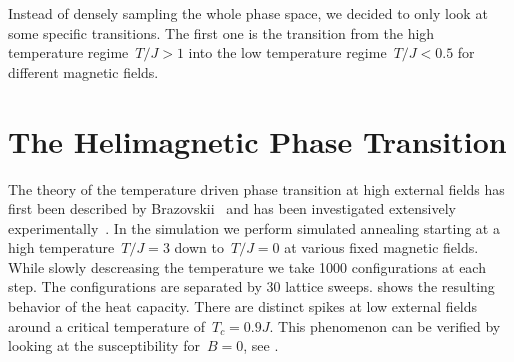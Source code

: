 Instead of densely sampling the whole phase space, we decided to only look at
some specific transitions. The first one is the transition from the high
temperature regime~$T/J > 1$ into the low temperature regime~$T/J < 0.5$ for
different magnetic fields.

\section{The Helimagnetic Phase Transition}\label{sec:details}
%
The theory of the temperature driven phase transition at high external fields
has first been described by Brazovskii~\cite{brazovskii} and has been
investigated extensively experimentally~\cite{exp1, exp2, exp3, exp4, exp5,
exp6}. In the simulation we perform simulated annealing starting at a high
temperature~$T/J = 3$ down to~$T/J=0$ at various fixed magnetic fields. While
slowly descreasing the temperature we take 1000 configurations at each step. The
configurations are separated by 30 lattice sweeps.   shows the
resulting behavior of the heat capacity. There are distinct spikes at low
external fields around a critical temperature of~$T_c =0.9 J$. This phenomenon
can be verified by looking at the susceptibility for~$B=0$, see
.

